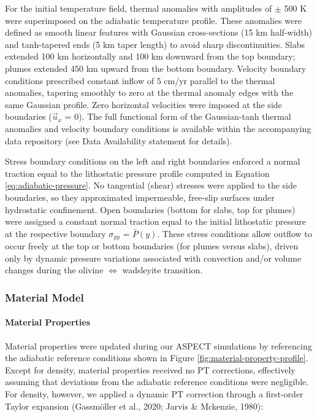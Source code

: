 \documentclass[draft,linenumbers]{agujournal2019}
\begin{document}
For the initial temperature field, thermal anomalies with amplitudes of
\(\pm\) 500 K were superimposed on the adiabatic temperature profile.
These anomalies were defined as smooth linear features with Gaussian
cross-sections (15 km half-width) and tanh-tapered ends (5 km taper
length) to avoid sharp discontinuities. Slabs extended 100 km
horizontally and 100 km downward from the top boundary; plumes extended
450 km upward from the bottom boundary. Velocity boundary conditions
prescribed constant inflow of 5 cm/yr parallel to the thermal anomalies,
tapering smoothly to zero at the thermal anomaly edges with the same
Gaussian profile. Zero horizontal velocities were imposed at the side
boundaries (\(\vec{u}_x\) = 0). The full functional form of the
Gaussian-tanh thermal anomalies and velocity boundary conditions is
available within the accompanying data repository (see Data Availability
statement for details).

Stress boundary conditions on the left and right boundaries enforced a
normal traction equal to the lithostatic pressure profile computed in
Equation \ref{eq:adiabatic-pressure}. No tangential (shear) stresses
were applied to the side boundaries, so they approximated impermeable,
free-slip surfaces under hydrostatic confinement. Open boundaries
(bottom for slabs, top for plumes) were assigned a constant normal
traction equal to the initial lithostatic pressure at the respective
boundary \(\sigma_{yy}\) = \(\bar{P}(y)\). These stress conditions allow
outflow to occur freely at the top or bottom boundaries (for plumes
versus slabs), driven only by dynamic pressure variations associated
with convection and/or volume changes during the olivine
\(\Leftrightarrow\) wadsleyite transition.

\subsubsection{Material Model}\label{sec:material-model}

\paragraph{Material Properties}\label{sec:material-properties}

Material properties were updated during our ASPECT simulations by
referencing the adiabatic reference conditions shown in Figure
\ref{fig:material-property-profile}. Except for density, material
properties received no PT corrections, effectively assuming that
deviations from the adiabatic reference conditions were negligible. For
density, however, we applied a dynamic PT correction through a
first-order Taylor expansion (Gassmöller et al., 2020; Jarvis \&
Mckenzie, 1980):
\end{document}
